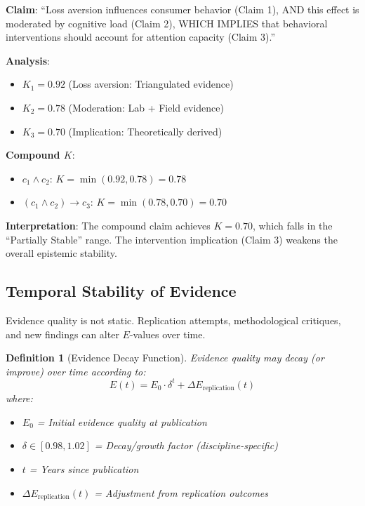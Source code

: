 \documentclass[11pt,a4paper]{article}
\newtheorem{definition}{Definition}[section]
\begin{document}
\begin{practicalbox}[title={Example: Compound Claim Analysis}]
\textbf{Claim}: ``Loss aversion influences consumer behavior (Claim 1), AND this effect is moderated by cognitive load (Claim 2), WHICH IMPLIES that behavioral interventions should account for attention capacity (Claim 3).''

\textbf{Analysis}:
\begin{itemize}
    \item $K_1 = 0.92$ (Loss aversion: Triangulated evidence)
    \item $K_2 = 0.78$ (Moderation: Lab + Field evidence)
    \item $K_3 = 0.70$ (Implication: Theoretically derived)
\end{itemize}

\textbf{Compound $K$}:
\begin{itemize}
    \item $c_1 \land c_2$: $K = \min(0.92, 0.78) = 0.78$
    \item $(c_1 \land c_2) \rightarrow c_3$: $K = \min(0.78, 0.70) = 0.70$
\end{itemize}

\textbf{Interpretation}: The compound claim achieves $K = 0.70$, which falls in the ``Partially Stable'' range. The intervention implication (Claim 3) weakens the overall epistemic stability.
\end{practicalbox}

\subsection{Temporal Stability of Evidence}

Evidence quality is not static. Replication attempts, methodological critiques, and new findings can alter $E$-values over time.

\begin{definition}[Evidence Decay Function]
\label{def:decay}
Evidence quality may decay (or improve) over time according to:
\begin{equation}
E(t) = E_0 \cdot \delta^t + \Delta E_{\text{replication}}(t)
\end{equation}
where:
\begin{itemize}
    \item $E_0$ = Initial evidence quality at publication
    \item $\delta \in [0.98, 1.02]$ = Decay/growth factor (discipline-specific)
    \item $t$ = Years since publication
    \item $\Delta E_{\text{replication}}(t)$ = Adjustment from replication outcomes
\end{itemize}
\end{definition}
\end{document}
